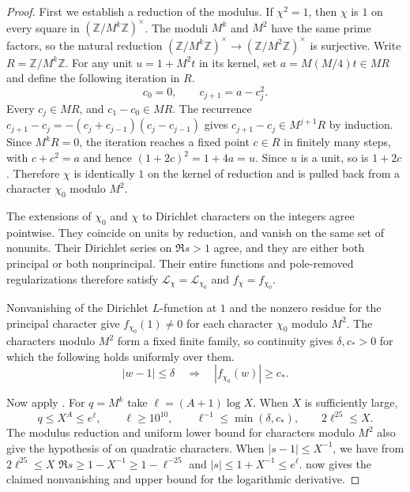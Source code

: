\begin{proof}
First we establish a reduction of the modulus. If $\chi^2=1$, then $\chi$ is $1$ on every square in $(\mathbb Z/M^k\mathbb Z)^\times$. The moduli $M^k$ and $M^2$ have the same prime factors, so the natural reduction $(\mathbb Z/M^k\mathbb Z)^\times\to(\mathbb Z/M^2\mathbb Z)^\times$ is surjective. Write $R=\mathbb Z/M^k\mathbb Z$. For any unit $u=1+M^2t$ in its kernel, set $a=M(M/4)t\in MR$ and define the following iteration in $R$.
\[
 c_0=0,\qquad c_{j+1}=a-c_j^2 .
\]
Every $c_j\in MR$, and $c_1-c_0\in MR$. The recurrence
$c_{j+1}-c_j=-(c_j+c_{j-1})(c_j-c_{j-1})$ gives $c_{j+1}-c_j\in M^{j+1}R$ by induction. Since $M^kR=0$, the iteration reaches a fixed point $c\in R$ in finitely many steps, with $c+c^2=a$ and hence $(1+2c)^2=1+4a=u$. Since $u$ is a unit, so is $1+2c$. Therefore $\chi$ is identically $1$ on the kernel of reduction and is pulled back from a character $\chi_0$ modulo $M^2$.

The extensions of $\chi_0$ and $\chi$ to Dirichlet characters on the integers agree pointwise. They coincide on units by reduction, and vanish on the same set of nonunits. Their Dirichlet series on $\Re s>1$ agree, and they are either both principal or both nonprincipal. Their entire functions and pole-removed regularizations therefore satisfy $\mathcal L_\chi=\mathcal L_{\chi_0}$ and $f_\chi=f_{\chi_0}$.

Nonvanishing of the Dirichlet $L$-function at $1$ and the nonzero residue for the principal character give $f_{\chi_0}(1)\ne0$ for each character $\chi_0$ modulo $M^2$. The characters modulo $M^2$ form a fixed finite family, so continuity gives $\delta,c_*>0$ for which the following holds uniformly over them.
\[
 |w-1|\le\delta\quad\Longrightarrow\quad |f_{\chi_0}(w)|\ge c_* .
\]

Now apply . For $q=M^k$ take $\ell=(A+1)\log X$. When $X$ is sufficiently large,
\[
 q\le X^A\le e^\ell,\qquad
 \ell\ge10^{10},\qquad
 \ell^{-1}\le\min(\delta,c_*),\qquad
 2\ell^{25}\le X .
\]
The modulus reduction and uniform lower bound for characters modulo $M^2$ also give the hypothesis of  on quadratic characters. When $|s-1|\le X^{-1}$, we have from $2\ell^{25}\le X$
$\Re s\ge1-X^{-1}\ge1-\ell^{-25}$ and $|s|\le1+X^{-1}\le e^\ell$.
 now gives the claimed nonvanishing and upper bound for the logarithmic derivative.
\end{proof}

